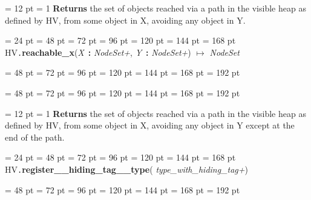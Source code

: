 {{{{{{\par \pagebreak[3.100000] \noindent \hangindent = 12 pt \hangafter = 1 
{\bf Returns \/} the set of objects reached via a path in the visible heap as
defined by HV, from some object in X, avoiding any object in Y.
\par}
\par}
\par}
\par}
\par}
{\par \noindent  \leftskip = 24 pt  \leftmargini = 48 pt  \leftmarginii = 72 pt  \leftmarginiii = 96 pt  \leftmarginiv = 120 pt  \leftmarginv = 144 pt  \leftmarginvi = 168 pt HV{\tt .\/}{\bf {\large {\bf reachable{\_}x\/}}\/}({\em X\/}~{\bf :}  {\em NodeSet+\/}, {\em Y\/}~{\bf :}  {\em NodeSet+\/}) \(\mapsto \)  {\em NodeSet\/}{\par \noindent
{\par \noindent  \leftskip = 48 pt  \leftmargini = 72 pt  \leftmarginii = 96 pt  \leftmarginiii = 120 pt  \leftmarginiv = 144 pt  \leftmarginv = 168 pt  \leftmarginvi = 192 pt {\par \noindent
\par}
\par}
{\par \noindent  \leftskip = 48 pt  \leftmargini = 72 pt  \leftmarginii = 96 pt  \leftmarginiii = 120 pt  \leftmarginiv = 144 pt  \leftmarginv = 168 pt  \leftmarginvi = 192 pt {\par \noindent
{\par \pagebreak[3.100000] \noindent \hangindent = 12 pt \hangafter = 1 
{\bf Returns \/} the set of objects reached via a path in the visible heap as
defined by HV, from some object in X, avoiding any object in Y except
at the end of the path.
\par}
\par}
\par}
\par}
\par}
{\par \noindent  \leftskip = 24 pt  \leftmargini = 48 pt  \leftmarginii = 72 pt  \leftmarginiii = 96 pt  \leftmarginiv = 120 pt  \leftmarginv = 144 pt  \leftmarginvi = 168 pt HV{\tt .\/}{\bf {\large {\bf register{\_}{\_}hiding{\_}tag{\_}{\_}type\/}}\/}( {\em type{\_}with{\_}hiding{\_}tag+\/}){\par \noindent
{\par \noindent  \leftskip = 48 pt  \leftmargini = 72 pt  \leftmarginii = 96 pt  \leftmarginiii = 120 pt  \leftmarginiv = 144 pt  \leftmarginv = 168 pt  \leftmarginvi = 192 pt {\par \noindent
}}}}}
